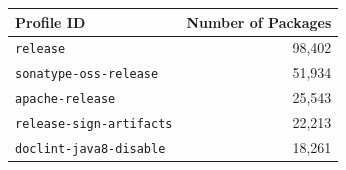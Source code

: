 \small
\begin{tabular}{@{}lr@{}}
    \toprule
    \textbf{Profile ID} & \textbf{Number of Packages} \\
    \midrule
    \texttt{release} & 98{,}402 \\
    \texttt{sonatype-oss-release} & 51{,}934 \\
    \texttt{apache-release} & 25{,}543 \\
    \texttt{release-sign-artifacts} & 22{,}213 \\
    \texttt{doclint-java8-disable} & 18{,}261 \\
    \bottomrule
\end{tabular}
